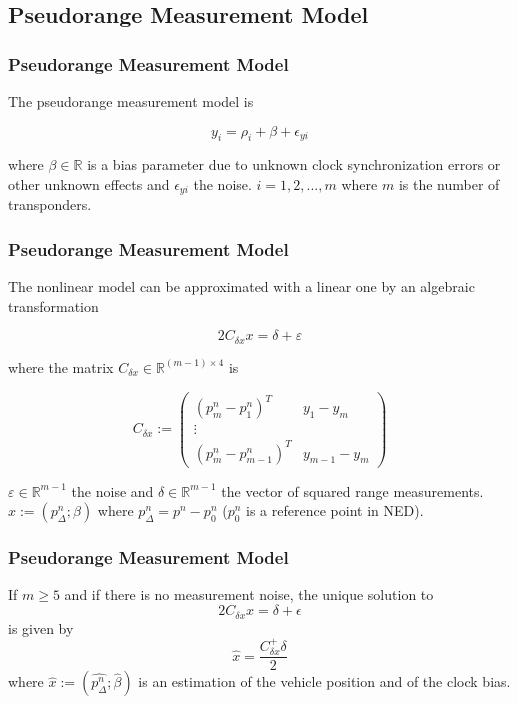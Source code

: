 \documentclass{beamer}
\begin{document}
\subsection{Pseudorange Measurement Model}
	\begin{frame}
		\frametitle{Pseudorange Measurement Model}
		The pseudorange measurement model is
		
		\[ y_i = \rho_i + \beta + \epsilon_{yi} \]
		
		where $\beta \in \mathds{R}$ is a bias parameter due to unknown clock synchronization errors or other unknown effects and $\epsilon_{yi}$ the noise.
		$i = 1,2,...,m$ where $m$ is the number of transponders.
	\end{frame}
	
	\begin{frame}
	\frametitle{Pseudorange Measurement Model}
	The nonlinear model can be approximated with a linear one by an algebraic transformation 
	
		\[ 2C_{\delta x}x = \delta + \varepsilon  \]
		
	where the matrix $C_{\delta x} \in \mathds{R}^{(m-1)\times4}$ is
	
	$$
	C_{\delta x} :=
	\begin{pmatrix}
	(p^n_m - p^n_1)^T & y_1 - y_m \\
	\vdots \\
	(p^n_m - p^n_{m-1})^T & y_{m-1} - y_m 
	\end{pmatrix} 
	$$
	
	$\varepsilon \in \mathds{R}^{m-1}$ the noise and $\delta \in \mathds{R}^{m-1}$ the vector of squared range measurements. \\ $x := (p^n_\Delta;\beta)$ where $p_\Delta^n = p^n - p^n_0$ ($p_0^n$ is a reference point in NED). 
	\end{frame}

	\begin{frame}
		\frametitle{Pseudorange Measurement Model}
		If $m \geqslant 5$ and if there is no measurement noise, the unique solution to
		\[ 2C_{\delta x} x = \delta + \epsilon \]
		is given by
		\[\hat{x} = \frac {C_{\delta x}^{+} \delta}{2}  \]
		where $\hat{x} := (\hat{p^n_\Delta};\hat{\beta})$ is an estimation of the vehicle position and of the clock bias.
\end{frame}
\end{document}
